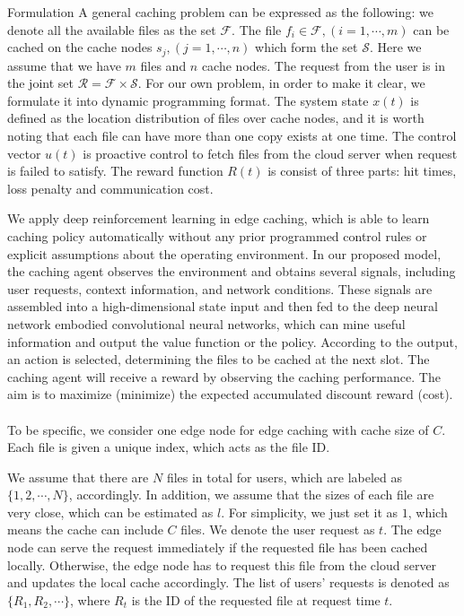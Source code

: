 \documentclass{article}
\begin{document}
\begin{section}{Formulation}
    \label{formulation}
    A general caching problem can be expressed as the following: we denote all the available files as the set $\mathcal{F}$. The file $f_i\in\mathcal{F},(i=1,\cdots,m)$ can be cached on the cache nodes $s_j,(j=1,\cdots,n)$ which form the set $\mathcal{S}$. Here we assume that we have $m$ files and $n$ cache nodes. The request from the user is in the joint set $\mathcal{R}=\mathcal{F}\times\mathcal{S}$. For our own problem, in order to make it clear, we formulate it into dynamic programming format. The system state $x(t)$ is defined as the location distribution of files over cache nodes, and it is worth noting that each file can have more than one copy exists at one time. The control vector $u(t)$ is proactive control to fetch files from the cloud server when request is failed to satisfy. The reward function $R(t)$ is consist of three parts: hit times, loss penalty and communication cost.

    We apply deep reinforcement learning in edge caching, which is able to learn caching policy automatically without any prior programmed control rules or explicit assumptions about the operating environment. In our proposed model, the caching agent observes the environment and obtains several signals, including user requests, context information, and network conditions. These signals are assembled into a high-dimensional state input and then fed to the deep neural network embodied convolutional neural networks, which can mine useful information and output the value function or the policy. According to the output, an action is selected, determining the files to be cached at the next slot. The caching agent will receive a reward by observing the caching performance. The aim is to maximize (minimize) the expected accumulated discount reward (cost).\\~\\

    To be specific, we consider one edge node for edge caching with cache size of $C$. Each file is given a unique index, which acts as the file ID. 

    We assume that there are $N$ files in total for users, which are labeled as $\{1,2,\cdots,N\}$, accordingly. In addition, we assume that the sizes of each file are very close, which can be estimated as $l$. For simplicity, we just set it as $1$, which means the cache can include $C$ files. We denote the user request as $t$. The edge node can serve the request immediately if the requested file has been cached locally. Otherwise, the edge node has to request this file from the cloud server and updates the local cache accordingly. The list of users' requests is denoted as $\{R_1,R_2,\cdots\}$, where $R_t$ is the ID of the requested file at request time $t$. \\~\\


\end{section}
\end{document}
